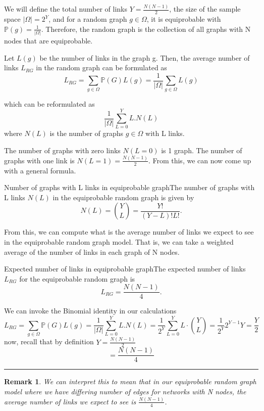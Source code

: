 \documentclass[twoside]{article}
\newcommand{\prob}{\mathbb{P}}
\newtheorem{remark}[theorem]{Remark}
\newenvironment{proof}{{\bf Proof:}}{\hfill\rule{2mm}{2mm}}
\begin{document}
We will define the total number of links $Y = \frac{N(N-1)}{2}$, the size of the sample space $|\Omega| = 2^Y$, and for a random graph $g \in \Omega$, it is equiprobable with $\prob(g) = \frac{1}{|\Omega|}.$ Therefore, the random graph is the collection of all graphs with N nodes that are equiprobable.

Let $L(g)$ be the number of links in the graph g. Then, the average number of links $L_{RG}$ in the random graph can be formulated as 
$$
L_{RG} = \sum_{g \in \Omega}\prob(G)L(g) = \frac{1}{|\Omega|}\sum_{g \in \Omega}L(g)
$$

which can be reformulated as 
$$
\frac{1}{|\Omega|}\sum_{L=0}^{Y}L.N(L)
$$
where $N(L)$ is the number of graphs $g \in \Omega$ with L links.

The number of graphs with zero links $N(L = 0)$ is 1 graph. The number of graphs with one link is $N(L = 1) = \frac{N(N - 1)}{2}$. From this, we can now come up with a general formula.



\begin{theorem_exam}{Number of graphs with L links in equiprobable graph}{}The number of graphs with L links $N(L)$ in the equiprobable random graph is given by
$$
N(L) = {Y \choose L} = \frac{Y!}{(Y - L)!L!}.
$$
\end{theorem_exam}

From this, we can compute what is the average number of links we expect to see in the equiprobable random graph model. That is, we can take a weighted average of the number of links in each graph of N nodes.

\begin{theorem_exam}{Expected number of links in equiprobable graph}{}The expected number of links $L_{RG}$ for the equiprobable random graph is
$$
L_{RG} = \frac{N(N-1)}{4}.
$$
\end{theorem_exam}

\begin{proof} We can invoke the Binomial identity in our calculations 
$$
L_{RG} = \sum_{g \in \Omega}\prob(G)L(g) = \frac{1}{|\Omega|}\sum_{L=0}^{Y}L.N(L) = \frac{1}{2^Y}\sum_{L = 0}^Y L \cdot {Y \choose L} = \frac{1}{2^Y}2^{Y - 1}Y = \frac{Y}{2}
$$
now, recall that by definition $Y = \frac{N(N - 1)}{2}$
$$
= \frac{N(N - 1)}{4}
$$
\end{proof}

\begin{remark} We can interpret this to mean that in our equiprobable random graph model where we have differing number of edges for networks with N nodes, the average number of links we expect to see is $\frac{N(N-1)}{4}$.
\end{remark}
\end{document}
